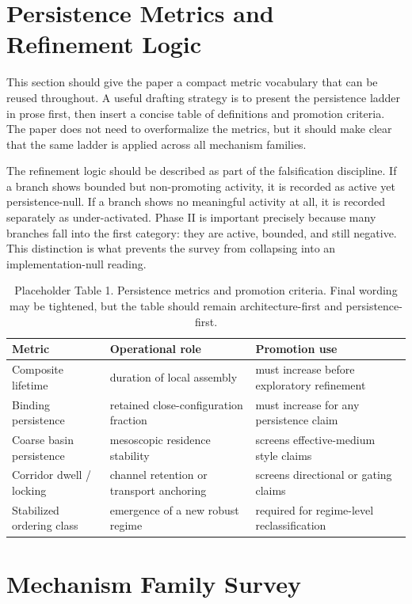 \documentclass[11pt]{article}
\begin{document}
\section{Persistence Metrics and Refinement Logic}

This section should give the paper a compact metric vocabulary that can be reused throughout. A useful drafting strategy is to present the persistence ladder in prose first, then insert a concise table of definitions and promotion criteria. The paper does not need to overformalize the metrics, but it should make clear that the same ladder is applied across all mechanism families.

The refinement logic should be described as part of the falsification discipline. If a branch shows bounded but non-promoting activity, it is recorded as active yet persistence-null. If a branch shows no meaningful activity at all, it is recorded separately as under-activated. Phase II is important precisely because many branches fall into the first category: they are active, bounded, and still negative. This distinction is what prevents the survey from collapsing into an implementation-null reading.

\begin{table}[h]
\centering
\small
\begin{tabular}{@{}p{2.0in}p{1.8in}p{2.2in}@{}}
\toprule
Metric & Operational role & Promotion use \\
\midrule
Composite lifetime & duration of local assembly & must increase before exploratory refinement \\
Binding persistence & retained close-configuration fraction & must increase for any persistence claim \\
Coarse basin persistence & mesoscopic residence stability & screens effective-medium style claims \\
Corridor dwell / locking & channel retention or transport anchoring & screens directional or gating claims \\
Stabilized ordering class & emergence of a new robust regime & required for regime-level reclassification \\
\bottomrule
\end{tabular}
\caption{Placeholder Table 1. Persistence metrics and promotion criteria. Final wording may be tightened, but the table should remain architecture-first and persistence-first.}
\label{tab:persistence_metrics}
\end{table}

\section{Mechanism Family Survey}
\end{document}

